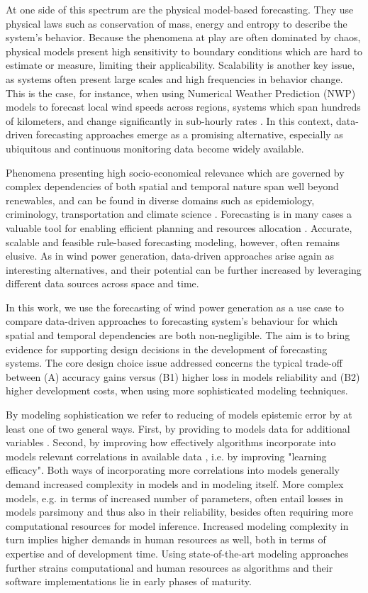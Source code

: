 At one side of this spectrum are the physical model-based forecasting.
They use physical laws such as conservation of mass, energy and entropy to describe the system's behavior.
Because the phenomena at play are often dominated by chaos, physical models present high sensitivity to boundary conditions which are hard to estimate or measure, limiting their applicability.
Scalability is another key issue, as systems often present large scales and high frequencies in behavior change.
This is the case, for instance, when using Numerical Weather Prediction (NWP) models to forecast local wind speeds across regions, systems which span hundreds of kilometers, and change significantly in sub-hourly rates \cite{}.
In this context, data-driven forecasting approaches emerge as a promising alternative, especially as ubiquitous and continuous monitoring data become widely available.

Phenomena presenting high socio-economical relevance which are governed by complex dependencies of both spatial and temporal nature span well beyond renewables, and can be found in diverse domains such as epidemiology, criminology, transportation and climate science \cite{atluri2018datamining}.
Forecasting is in many cases a valuable tool for enabling efficient planning and resources allocation \cite{armstrong2002principles}.
Accurate, scalable and feasible rule-based forecasting modeling, however, often remains elusive.
As in wind power generation, data-driven approaches arise again as interesting alternatives, and their potential can be further increased by leveraging different data sources across space and time.

In this work, we use the forecasting of wind power generation as a use case to compare data-driven approaches to forecasting system's behaviour for which spatial and temporal dependencies are both non-negligible.
The aim is to bring evidence for supporting design decisions in the development of forecasting systems.
The core design choice issue addressed concerns the typical trade-off between (A) accuracy gains versus (B1) higher loss in  models reliability and (B2) higher development costs, when using more sophisticated modeling techniques.

By modeling sophistication we refer to reducing of models epistemic error by at least one of two general ways.
First, by providing to models data for additional variables \cite{}.
Second, by improving how effectively algorithms incorporate into models relevant correlations in available data \cite{}, i.e. by improving "learning efficacy".
Both ways of incorporating more correlations into models generally demand increased complexity in models and in modeling itself.
More complex models, e.g. in terms of increased number of parameters, often entail losses in models parsimony and thus also in their reliability, besides often requiring more computational resources for model inference.
Increased modeling complexity in turn implies higher demands in human resources as well, both in terms of expertise and of development time.
Using state-of-the-art modeling approaches further strains computational and human resources as algorithms and their software implementations lie in early phases of maturity.


